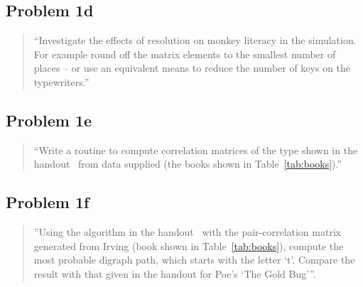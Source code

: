 \documentclass[conference]{IEEEtran}
\begin{document}
\begin{framed}
\fontsize{5.65}{6.78}\selectfont

\end{framed}

\subsection{Problem 1d}

\begin{quote}
``Investigate the effects of resolution on monkey literacy in the simulation. 
For example round off the matrix elements to the smallest number of places --
or use an equivalent means to reduce the number of keys on the typewriters.''
\end{quote}

\begin{framed}
\fontsize{5.65}{6.78}\selectfont

\end{framed}

\subsection{Problem 1e}

\begin{quote}
``Write a routine to compute correlation matrices of the type shown in the 
handout~\cite{Bennett1976} from data supplied (the books shown in Table~\ref{tab:books}).''
\end{quote}

\begin{framed}
\fontsize{5.65}{6.78}\selectfont

\end{framed}

\subsection{Problem 1f}

\begin{quote}
''Using the algorithm in the handout~\cite{Bennett1976} with the pair-correlation matrix 
generated from Irving (book shown in Table~\ref{tab:books}), compute the most 
probable digraph path, which starts with the letter `t'. Compare the result with 
that given in the handout for Poe's `The Gold Bug'''.
\end{quote}

\begin{framed}
\fontsize{5.65}{6.78}\selectfont

\end{framed}
\end{document}
